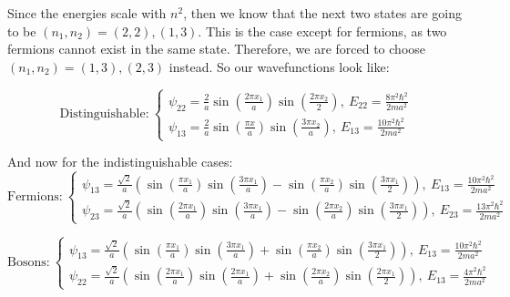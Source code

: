 \documentclass[10pt]{article}
\begin{document}
    \begin{solution}
        Since the energies scale with $n^2$, then we know that the next two states are going to be $(n_1, n_2) = (2, 2), (1, 3)$. This is the case except for fermions, as two fermions cannot exist in the same state. Therefore, we are forced to choose $(n_1, n_2) = (1, 3), (2, 3)$ instead. So our wavefunctions look like:

        \[  \text{Distinguishable:} \ 
        \begin{cases}
                \psi_{22} = \frac 2a \sin \left( \frac{2 \pi x_1}{a}\right) \sin \left( \frac{2\pi x_2}{2}\right), \ E_{22} = \frac{8 \pi^2\hbar^2}{2ma^2}\\
            \psi_{13} = \frac 2a \sin \left( \frac{\pi x}{a}\right) \sin \left( \frac{3\pi x_2}{a}\right), \ E_{13} = \frac{10\pi^2\hbar^2}{2ma^2}
        \end{cases}\]

        And now for the indistinguishable cases:
        \[ \text{Fermions:} \ 
        \begin{cases}
            \psi_{13} = \frac{\sqrt 2}{a} \left( \sin\left(\frac{\pi x_1}{a}\right)\sin \left( \frac{3\pi x_1}{a}\right) - \sin \left( \frac{\pi x_2}{a}\right)\sin \left( \frac{3\pi x_1}{2}\right)\right), \ E_{13} = \frac{10\pi^2 \hbar^2}{2ma^2}\\
            \psi_{23} = \frac{\sqrt 2}{a} \left( \sin\left(\frac{2\pi x_1}{a}\right)\sin \left( \frac{3\pi x_1}{a}\right) - \sin \left( \frac{2\pi x_2}{a}\right)\sin \left( \frac{3\pi x_1}{2}\right)\right), \ E_{23} = \frac{13\pi^2 \hbar^2}{2ma^2}
        \end{cases}\] 

        \[ \text{Bosons:} \ 
        \begin{cases}
            \psi_{13} = \frac{\sqrt 2}{a} \left( \sin\left(\frac{\pi x_1}{a}\right)\sin \left( \frac{3\pi x_1}{a}\right) + \sin \left( \frac{\pi x_2}{a}\right)\sin \left( \frac{3\pi x_1}{2}\right)\right), \ E_{13} = \frac{10\pi^2 \hbar^2}{2ma^2}\\
            \psi_{22}  = \frac{\sqrt 2}{a} \left( \sin\left(\frac{2\pi x_1}{a}\right)\sin \left( \frac{2\pi x_1}{a}\right) + \sin \left( \frac{2\pi x_2}{a}\right)\sin \left( \frac{2\pi x_1}{2}\right)\right), \ E_{13} = \frac{4\pi^2 \hbar^2}{2ma^2}
        \end{cases}\] 
        
    \end{solution}

    \pagebreak
\end{document}
